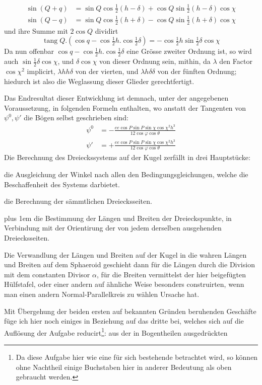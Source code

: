 %
\[
\begin{aligned}
\sin(Q+q)&=\sin Q\cos\tfrac{1}{2}(h-\delta)+\cos Q\sin\tfrac{1}{2}(h-\delta)\cos\chi\\
\sin(Q-q)&=\sin Q\cos\tfrac{1}{2}(h+\delta)-\cos Q\sin\tfrac{1}{2}(h+\delta)\cos\chi
\end{aligned}
\]
und ihre Summe mit \(2\cos Q\) dividirt
\[
\operatorname{tang}Q\mathord{.}(\cos q-\cos\tfrac{1}{2}h\mathord{.}\cos\tfrac{1}{2}\delta)=-\cos\tfrac{1}{2}h\sin\tfrac{1}{2}\delta\cos\chi
\]
\indent Da nun offenbar \(\cos q-\cos\tfrac{1}{2}h\mathord{.}\cos\tfrac{1}{2}\delta\) eine Grösse zweiter Ordnung ist, so wird auch \(\sin\tfrac{1}{2}\delta\cos\chi\), und \(\delta\cos\chi\) von dieser Ordnung sein, mithin, da \(\lambda\) den Factor \(\cos\chi^2\) implicirt, \(\lambda hh\delta\) von der vierten, und \(\lambda h\delta\delta\) von der fünften Ordnung; hiedurch ist also die Weglassung dieser Glieder gerechtfertigt.

Das Endresultat dieser Entwicklung ist demnach, unter der angegebenen Voraussetzung, in folgenden Formeln enthalten, wo anstatt der Tangenten von \(\psi^0,\psi'\) die Bögen selbst geschrieben sind:
\[
\begin{aligned}
\psi^0&=-\frac{ee\cos P\sin P\sin\chi\cos\chi^2h^3}{12\cos\varphi\cos\theta}\\
\psi'&=+\frac{ee\cos P\sin P\sin\chi\cos\chi^2h^3}{12\cos\varphi\cos\theta}
\end{aligned}
\]
Die Berechnung des Dreieckssystems auf der Kugel zerfällt in drei Hauptstücke:
\begin{list}{}{\setlength{\leftmargin}{1.8em}\setlength{\labelwidth}{1.4em}\setlength{\labelsep}{.4em}\setlength{\itemsep}{0pt}}
\item[1)] die Ausgleichung der Winkel nach allen den Bedingungsgleichungen, welche die Beschaffenheit des Systems darbietet.
\item[2)] die Berechnung der sämmtlichen Dreiecksseiten.
\item[3)] \begingroup\rightskip=0pt plus 1em
die Bestimmung der Längen und Breiten der Dreieckspunkte, in Verbindung mit der Orientirung der von jedem derselben ausgehenden Dreiecksseiten.\par\endgroup
\end{list}
\hspace*{\parindent}Die Verwandlung der Längen und Breiten auf der Kugel in die wahren Längen und Breiten auf dem Sphaeroid geschieht dann für die Längen durch die Division mit dem constanten Divisor \(\alpha\), für die Breiten vermittelst der hier beigefügten Hülfstafel, oder einer andern auf ähnliche Weise besonders construirten, wenn man einen andern Normal-Parallelkreis zu wählen Ursache hat.

Mit Übergehung der beiden ersten auf bekannten Gründen beruhenden Geschäfte füge ich hier noch einiges in Beziehung auf das dritte bei, welches sich auf die Auflösung der Aufgabe reducirt\footnote{Da diese Aufgabe hier wie eine für sich bestehende betrachtet wird, so können ohne Nachtheil einige Buchstaben hier in anderer Bedeutung als oben gebraucht werden.}: aus der in Bogentheilen ausgedrückten
